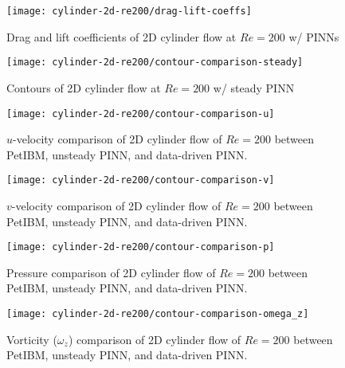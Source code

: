 \begin{figure}[!hbt]
    \centering%
    \texttt{[image: cylinder-2d-re200/drag-lift-coeffs]}%
    \caption{%
        Drag and lift coefficients of 2D cylinder flow at $Re=\num{200}$ w/ PINNs
    }
    \label{fig:cylinder-re200-drag-lift}%
\end{figure}

\lipsum[1]

\begin{figure}[!hbt]
    \centering%
    \texttt{[image: cylinder-2d-re200/contour-comparison-steady]}%
    \caption{%
        Contours of 2D cylinder flow at $Re=\num{200}$ w/ steady PINN
    }
    \label{fig:cylinder-re200-steady-pinn-contours}%
\end{figure}

\begin{figure*}[!hbt]
    \centering%
    \texttt{[image: cylinder-2d-re200/contour-comparison-u]}%
    \caption{%
        $u$-velocity comparison of 2D cylinder flow of $Re=\num{200}$ between PetIBM, unsteady PINN, and data-driven PINN.
    }
    \label{fig:cylinder-re200-pinn-contours-u}%
\end{figure*}

\begin{figure*}[!hbt]
    \centering%
    \texttt{[image: cylinder-2d-re200/contour-comparison-v]}%
    \caption{%
        $v$-velocity comparison of 2D cylinder flow of $Re=\num{200}$ between PetIBM, unsteady PINN, and data-driven PINN.
    }
    \label{fig:cylinder-re200-pinn-contours-v}%
\end{figure*}

\begin{figure*}[!hbt]
    \centering%
    \texttt{[image: cylinder-2d-re200/contour-comparison-p]}%
    \caption{%
        Pressure comparison of 2D cylinder flow of $Re=\num{200}$ between PetIBM, unsteady PINN, and data-driven PINN.
    }
    \label{fig:cylinder-re200-pinn-contours-p}%
\end{figure*}

\begin{figure*}[!hbt]
    \centering%
    \texttt{[image: cylinder-2d-re200/contour-comparison-omega\_z]}%
    \caption{%
        Vorticity ($\omega_z$) comparison of 2D cylinder flow of $Re=\num{200}$ between PetIBM, unsteady PINN, and data-driven PINN.
    }
    \label{fig:cylinder-re200-pinn-contours-omega_z}%
\end{figure*}

